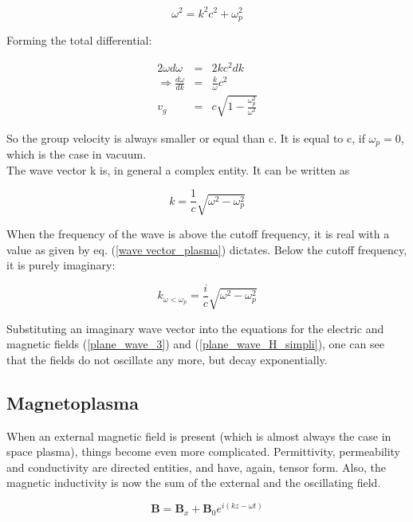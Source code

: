 \documentclass[a4paper,14pt]{extbook}
\begin{document}
\begin{equation}
    \omega^2=k^2c^2+\omega_p^2
\end{equation}

Forming the total differential:

\begin{eqnarray}
    2\omega d\omega&=&2kc^2dk\\
    \Rightarrow \frac{d\omega}{dk}&=&\frac{k}{\omega}c^2\nonumber \\
    v_g&=&c\sqrt{1-\frac{\omega_p^2}{\omega^2}}
\end{eqnarray}

So the group velocity is always smaller or equal than c. It is equal to c, if $\omega_p=0$, which is the case in vacuum.\\

The wave vector k is, in general a complex entity. It can be written as

\begin{equation}\label{wave vector_plasma}
    k=\frac{1}{c} \sqrt{\omega^2-\omega_p^2 }
\end{equation}

When the frequency of the wave is above the cutoff frequency, it is real with a value as given by eq. (\ref{wave vector_plasma}) dictates. Below the cutoff frequency, it is purely imaginary:

\begin{equation}\label{wave vector_plasma_imag}
    k_{\omega<\omega_p}=\frac{i}{c} \sqrt{\omega^2-\omega_p^2 }
\end{equation}

Substituting an imaginary wave vector into the equations for the electric and magnetic fields (\ref{plane_wave_3}) and (\ref{plane_wave_H_simpli}), one can see that the fields do not oscillate any more, but decay exponentially.

\subsection{Magnetoplasma}
When an external magnetic field is present (which is almost always the case in space plasma), things become even more complicated. Permittivity, permeability and conductivity are directed entities, and have, again, tensor form. Also, the magnetic inductivity is now the sum of the external and the oscillating field.

\begin{equation}\label{B_magnetoplasma}
    \mathbf{B}=\mathbf{B}_x + \mathbf{B}_0 e^{i(kz-\omega t)}
\end{equation}
\end{document}
